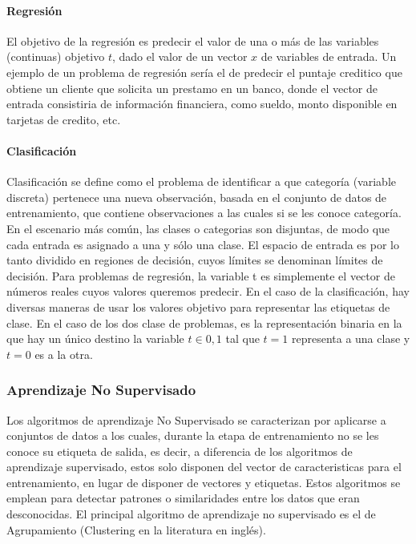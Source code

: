 \documentclass[a4paper,11pt,spanish]{book}
\begin{document}
	\paragraph {Regresión}
	  El objetivo de la regresión es predecir el valor de una o más de las variables (continuas) objetivo $t$, dado el valor de un vector $x$ de variables de entrada.
	  Un ejemplo de un problema de regresión sería el de predecir el puntaje creditico que obtiene un cliente que solicita un prestamo en un banco, donde el vector de entrada
	  consistiria de información financiera, como sueldo, monto disponible en tarjetas de credito, etc.
	
	\paragraph {Clasificación}
	  Clasificación se define como el problema de identificar a que categoría (variable discreta) pertenece una nueva observación, basada en el conjunto de datos de entrenamiento,
	  que contiene observaciones a las cuales  si se les conoce categoría. En el escenario más común, las clases o categorias son disjuntas,
	  de modo que cada entrada es asignado a una y sólo una clase. El espacio de entrada es por lo tanto dividido en regiones de decisión, cuyos límites se denominan límites de decisión.
	  Para problemas de regresión, la variable t es simplemente el vector de números reales cuyos valores queremos predecir. En el caso de la clasificación,
	  hay diversas maneras de usar los valores objetivo para representar las etiquetas de clase. En el caso de los dos clase de problemas, es la representación binaria
	  en la que hay un único destino la variable $t \in {0, 1}$ tal que $t = 1$ representa a una clase y $t = 0$ es a la otra.

      \subsubsection{Aprendizaje No Supervisado}
	  Los algoritmos de aprendizaje No Supervisado se caracterizan por aplicarse a conjuntos de datos a los cuales, durante la etapa de entrenamiento no se les conoce su etiqueta 
	  de salida, es decir, a diferencia de los algoritmos de aprendizaje supervisado, estos solo disponen del vector de caracteristicas para el entrenamiento, en lugar de disponer 
	  de vectores y etiquetas. Estos algoritmos se emplean para detectar patrones o similaridades entre los datos que eran desconocidas.
	  El principal algoritmo de aprendizaje no supervisado es el de Agrupamiento (Clustering en la literatura en inglés).
	
\end{document}
